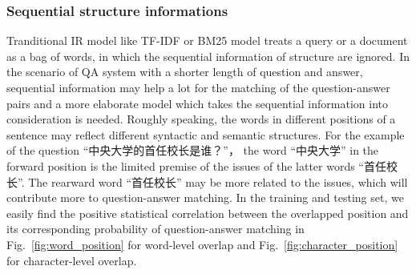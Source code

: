 \documentclass{llncs}
\begin{document}
\subsubsection{Sequential structure informations}

Tranditional IR model like TF-IDF or BM25 model treats a query or a document as a bag of words, in which the sequential information of structure are ignored. In the scenario of QA system with a shorter length of question and answer, sequential information may help a lot for the matching of the question-answer pairs and a more elaborate model which takes the sequential information into consideration is needed. Roughly speaking, the words in different positions of a sentence may reflect different syntactic and semantic structures. For the example of the question ``中央大学的首任校长是谁？''， the word ``中央大学'' in the forward position is the limited premise of the issues of the latter words ``首任校长''.  The rearward word ``首任校长'' may be more related to the issues, which will contribute more to question-answer matching. In the training and testing set, we easily find the positive statistical correlation between the overlapped position and its corresponding probability of question-answer matching in Fig.~\ref{fig:word_position} for word-level overlap and Fig.~\ref{fig:character_position} for character-level overlap. 
\end{document}
